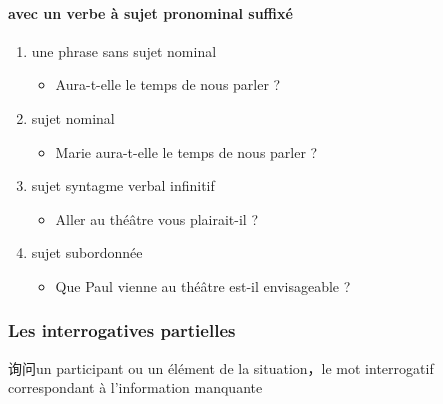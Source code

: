 \documentclass[UTF8]{report}
\begin{document}
\paragraph{avec un verbe à sujet pronominal suffixé}
\begin{enumerate}
    \item une phrase sans sujet nominal
    \begin{itemize}
        \item Aura-t-elle le temps de nous parler ?
    \end{itemize}
    \item sujet nominal
    \begin{itemize}
        \item Marie aura-t-elle le temps de nous parler ?
    \end{itemize}
    \item sujet syntagme verbal infinitif
    \begin{itemize}
        \item Aller au théâtre vous plairait-il ?
    \end{itemize}
    \item sujet subordonnée
    \begin{itemize}
        \item Que Paul vienne au théâtre est-il envisageable ?
    \end{itemize}
\end{enumerate}


\subsubsection{Les interrogatives partielles}
询问un participant ou un élément de la situation，le mot interrogatif correspondant à l’information manquante
\end{document}
